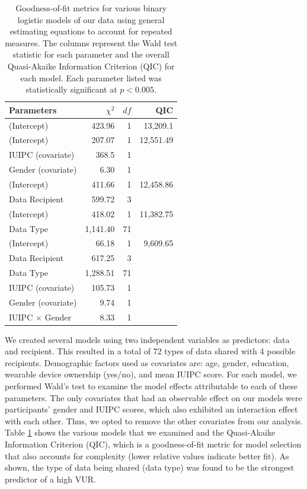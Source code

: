 \documentclass[conference]{IEEEtran}
\begin{document}
\begin{table}[t]
\centering
\begin{tabular}{|l| r| r| r|}
\hline
Parameters & $\chi^2$ & $df$ & QIC\\
\hline
\hline
(Intercept) & 423.96 & 1 & 13,209.1\\
\hline
(Intercept) & 207.07 & 1 & 12,551.49\\
IUIPC (covariate) & 368.5 & 1 & \\
Gender (covariate) & 6.30 & 1 & \\
\hline
(Intercept) & 411.66 & 1 &12,458.86\\
Data Recipient & 599.72 & 3 & \\
\hline
(Intercept) & 418.02 & 1 & 11,382.75\\
Data Type & 1,141.40 & 71 & \\
\hline
(Intercept) & 66.18 & 1 & 9,609.65 \\
Data Recipient & 617.25 & 3 & \\
Data Type & 1,288.51 & 71 & \\
IUIPC (covariate) & 105.73 & 1 & \\
Gender (covariate) & 9.74 & 1 & \\
IUIPC $\times$ Gender & 8.33 & 1 &\\
\hline
\end{tabular}
\caption{Goodness-of-fit metrics for various binary logistic models of our data using general estimating equations to account for repeated measures. The columns represent the Wald test statistic for each parameter and the overall Quasi-Akaike Information Criterion (QIC) for each model. Each parameter listed was statistically significant at $p<0.005$.}
\label{regression}
\end{table}

We created several models using two independent variables as predictors: data and recipient. This resulted in a total of 72 types of data shared with 4 possible recipients. Demographic factors used as covariates are: age, gender, education, wearable device ownership (yes/no), and mean IUIPC score. For each model, we performed Wald's test to examine the model effects attributable to each of these parameters. The only covariates that had an observable effect on our models were participants' gender and IUIPC scores, which also exhibited an interaction effect with each other. Thus, we opted to remove the other covariates from our analysis. Table \ref{regression} shows the various models that we examined and the Quasi-Akaike Information Criterion (QIC), which is a goodness-of-fit metric for model selection that also accounts for complexity (lower relative values indicate better fit). As shown, the type of data being shared (data type) was found to be the strongest predictor of a high VUR.
\end{document}
